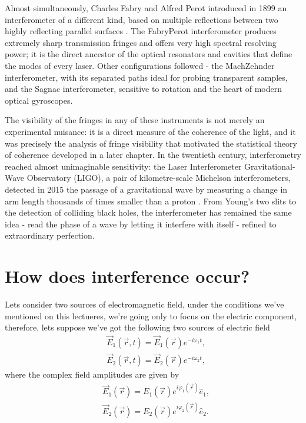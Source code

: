     Almost simultaneously, Charles Fabry and Alfred Perot introduced in 1899 an interferometer
    of a different kind, based on multiple reflections between two highly reflecting parallel
    surfaces \cite{fabry1899theorie}. The FabryPerot interferometer produces extremely sharp
    transmission fringes and offers very high spectral resolving power; it is the direct
    ancestor of the optical resonators and cavities that define the modes of every laser. Other
    configurations followed - the MachZehnder interferometer, with its separated paths ideal
    for probing transparent samples, and the Sagnac interferometer, sensitive to rotation and
    the heart of modern optical gyroscopes.

    The visibility of the fringes in any of these instruments is not merely an experimental
    nuisance: it is a direct measure of the coherence of the light, and it was precisely the
    analysis of fringe visibility that motivated the statistical theory of coherence developed
    in a later chapter. In the twentieth century, interferometry reached almost unimaginable
    sensitivity: the Laser Interferometer Gravitational-Wave Observatory (LIGO), a pair of
    kilometre-scale Michelson interferometers, detected in 2015 the passage of a gravitational
    wave by measuring a change in arm length thousands of times smaller than a proton
    \cite{abbott2016observation}. From Young's two slits to the detection of colliding black
    holes, the interferometer has remained the same idea - read the phase of a wave by letting
    it interfere with itself - refined to extraordinary perfection.

\section{How does interference occur?}

    Lets consider two sources of electromagnetic field, under the conditions we've mentioned on this lectueres, we're going only to focus on the electric component, therefore, lets suppose we've got the following two sources of electric field
    \begin{align}
        & \vec{E}_1\left(\vec{r},t\right) = \vec{E}_1(\vec{r})e^{-i\omega_1 t},\\
        & \vec{E}_2\left(\vec{r},t\right) = \vec{E}_2(\vec{r})e^{-i\omega_2 t},
    \end{align}
    where the complex field amplitudes are given by
    \begin{align}
        & \vec{E}_1(\vec{r}) = E_1(\vec{r})e^{i\varphi_1(\vec{r})}\hat{e}_1,\\
        & \vec{E}_2(\vec{r}) = E_2(\vec{r})e^{i\varphi_2(\vec{r})}\hat{e}_2.
    \end{align}

